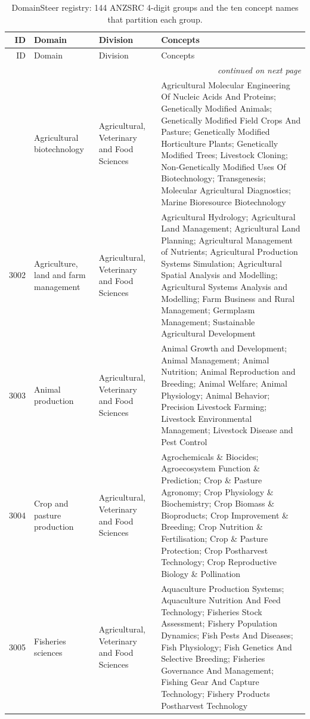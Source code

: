 \begingroup
\scriptsize
\setlength{\tabcolsep}{2.5pt}
\setlength{\LTcapwidth}{\textwidth}

\begin{longtable}{r p{2.45cm} p{2.55cm} p{6.15cm}}
\caption{DomainSteer registry: 144 ANZSRC 4-digit groups and the ten concept names that partition each group.}
\label{tab:app-registry} \\
\toprule
ID & Domain & Division & Concepts \\
\midrule
\endfirsthead
\toprule
ID & Domain & Division & Concepts \\
\midrule
\endhead
\midrule
\multicolumn{4}{r}{\emph{continued on next page}} \\
\endfoot
\bottomrule
\endlastfoot
3001 & Agricultural biotechnology & Agricultural, Veterinary and Food Sciences & Agricultural Molecular Engineering Of Nucleic Acids And Proteins; Genetically Modified Animals; Genetically Modified Field Crops And Pasture; Genetically Modified Horticulture Plants; Genetically Modified Trees; Livestock Cloning; Non-Genetically Modified Uses Of Biotechnology; Transgenesis; Molecular Agricultural Diagnostics; Marine Bioresource Biotechnology \\
3002 & Agriculture, land and farm management & Agricultural, Veterinary and Food Sciences & Agricultural Hydrology; Agricultural Land Management; Agricultural Land Planning; Agricultural Management of Nutrients; Agricultural Production Systems Simulation; Agricultural Spatial Analysis and Modelling; Agricultural Systems Analysis and Modelling; Farm Business and Rural Management; Germplasm Management; Sustainable Agricultural Development \\
3003 & Animal production & Agricultural, Veterinary and Food Sciences & Animal Growth and Development; Animal Management; Animal Nutrition; Animal Reproduction and Breeding; Animal Welfare; Animal Physiology; Animal Behavior; Precision Livestock Farming; Livestock Environmental Management; Livestock Disease and Pest Control \\
3004 & Crop and pasture production & Agricultural, Veterinary and Food Sciences & Agrochemicals \& Biocides; Agroecosystem Function \& Prediction; Crop \& Pasture Agronomy; Crop Physiology \& Biochemistry; Crop Biomass \& Bioproducts; Crop Improvement \& Breeding; Crop Nutrition \& Fertilisation; Crop \& Pasture Protection; Crop Postharvest Technology; Crop Reproductive Biology \& Pollination \\
3005 & Fisheries sciences & Agricultural, Veterinary and Food Sciences & Aquaculture Production Systems; Aquaculture Nutrition And Feed Technology; Fisheries Stock Assessment; Fishery Population Dynamics; Fish Pests And Diseases; Fish Physiology; Fish Genetics And Selective Breeding; Fisheries Governance And Management; Fishing Gear And Capture Technology; Fishery Products Postharvest Technology \\

\end{longtable}

